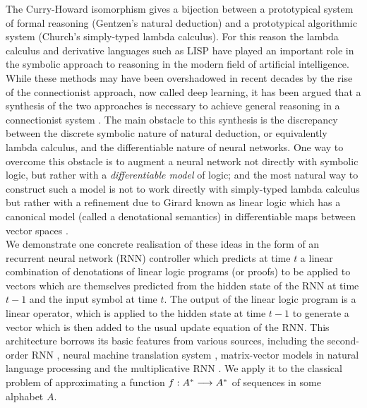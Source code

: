 \documentclass[english,letter paper,12pt,leqno]{article}
\theoremstyle{example}
\numberwithin{equation}{section}
\begin{document}
The Curry-Howard isomorphism \cite{sorensen} gives a bijection between a prototypical system of formal reasoning (Gentzen's natural deduction) and a prototypical algorithmic system (Church's simply-typed lambda calculus). For this reason the lambda calculus and derivative languages such as LISP have played an important role in the symbolic approach to reasoning in the modern field of artificial intelligence. While these methods may have been overshadowed in recent decades by the rise of the connectionist approach, now called deep learning, it has been argued that a synthesis of the two approaches is necessary to achieve general reasoning in a connectionist system \cite{minsky}. The main obstacle to this synthesis is the discrepancy between the discrete symbolic nature of natural deduction, or equivalently lambda calculus, and the differentiable nature of neural networks. One way to overcome this obstacle is to augment a neural network not directly with symbolic logic, but rather with a \emph{differentiable model} of logic; and the most natural way to construct such a model is not to work directly with simply-typed lambda calculus but rather with a refinement due to Girard known as linear logic \cite{girard} which has a canonical model (called a denotational semantics) in differentiable maps between vector spaces \cite{ehrhard-survey,blutecon,murfetclift}. 
\\

We demonstrate one concrete realisation of these ideas in the form of an recurrent neural network (RNN) controller \cite{elman} which predicts at time $t$ a linear combination of denotations of linear logic programs (or proofs) to be applied to vectors which are themselves predicted from the hidden state of the RNN at time $t-1$ and the input symbol at time $t$. The output of the linear logic program is a linear operator, which is applied to the hidden state at time $t-1$ to generate a vector which is then added to the usual update equation of the RNN. This architecture borrows its basic features from various sources, including the second-order RNN \cite{joulin}, neural machine translation system \cite{??}, matrix-vector models in natural language processing \cite{??} and the multiplicative RNN \cite{??}. We apply it to the classical problem \cite{??} of approximating a function $f: A^* \longrightarrow A^*$ of sequences in some alphabet $A$.

\end{document}
